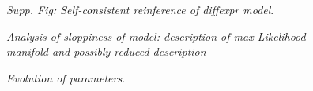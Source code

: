 \documentclass[letterpaper,english,prl,reprint,longbibliography]{revtex4-1} %
\begin{document}

\begin{figure}[ht!]
\caption{
\emph{Supp. Fig: Self-consistent reinference of diffexpr model}.
\label{fig:suppfig2_reinf_diffexpr}}
\end{figure}

\begin{figure}[ht!]
\caption{
\emph{Analysis of sloppiness of model: description of max-Likelihood manifold and possibly reduced description}
\label{fig:Data}}
\end{figure}

\begin{figure}[ht!]
\caption{
\emph{Evolution of parameters}. 
\label{fig:timeevo}}
\end{figure}
\end{document}
